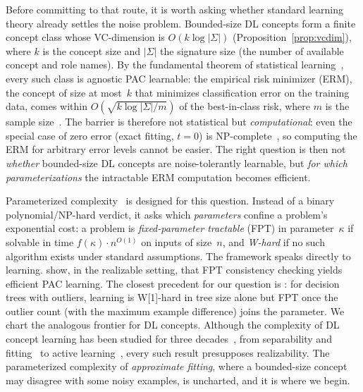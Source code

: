 \documentclass[accepted]{uai2026} %
\theoremstyle{definition}
\theoremstyle{remark}
\begin{document}
Before committing to that route, it is worth
asking whether standard learning theory already settles the noise
problem.
Bounded-size DL concepts form a finite concept class
whose VC-dimension is $O(k\log|\Sigma|)$
(Proposition~\ref{prop:vcdim}), where $k$ is the concept
size and $|\Sigma|$ the signature size (the
number of available concept and role names). By the fundamental theorem
of statistical
learning~\citep{DBLP:books/daglib/0033642,
DBLP:journals/iandc/Haussler92}, every such class is agnostic PAC
learnable: the empirical risk minimizer (ERM),
the concept of size at
most~$k$ that minimizes classification error on the training
data, comes within
$O(\sqrt{k\log|\Sigma|/m})$ of the best-in-class risk, where $m$ is the sample
size~\citep{DBLP:journals/ml/KearnsSS94}. The barrier is therefore
not statistical but \emph{computational}: even the special case of
zero error (exact fitting, $t{=}0$) is
NP-complete~\citep{DBLP:conf/semweb/FunkJV25}, so computing the
ERM for arbitrary error levels cannot be easier. The
right question is then not \emph{whether} bounded-size DL concepts are
noise-tolerantly learnable, but \emph{for which parameterizations}
the intractable ERM computation becomes efficient.

Parameterized complexity~\citep{DBLP:series/txcs/DowneyF13,
DBLP:books/sp/CyganFKLMPPS15} is designed for
this question. Instead of a binary polynomial/NP-hard verdict, it asks
which \emph{parameters} confine a problem's exponential cost:
a problem is \emph{fixed-parameter tractable} (FPT) in
parameter~$\kappa$ if solvable in time $f(\kappa) \cdot n^{O(1)}$
on inputs of size~$n$,
and \emph{W-hard} if no such algorithm exists under standard
assumptions.
The framework speaks directly to learning.
\citet{DBLP:conf/aaai/BrandGS23} show, in the
realizable setting, that FPT consistency checking yields efficient
PAC learning. The closest precedent for our question is
\citet{DBLP:conf/aaai/GahlawatZ24}: for decision trees with
outliers, learning is W[1]-hard in tree size alone but FPT once the
outlier count (with the maximum example difference) joins the
parameter. We chart the analogous frontier for
DL concepts.
Although the complexity of DL concept
learning has been studied for three decades~\citep{DBLP:conf/colt/CohenH92,
DBLP:journals/ml/CohenH94}, from separability and
fitting~\citep{DBLP:conf/ijcai/FunkJLPW19, DBLP:conf/semweb/FunkJV25}
to active learning~\citep{DBLP:conf/ijcai/FunkJL21}, every such
result presupposes realizability. The parameterized complexity of
\emph{approximate fitting}, where a bounded-size concept may
disagree with some noisy examples, is uncharted, and it is where we
begin.
\end{document}
